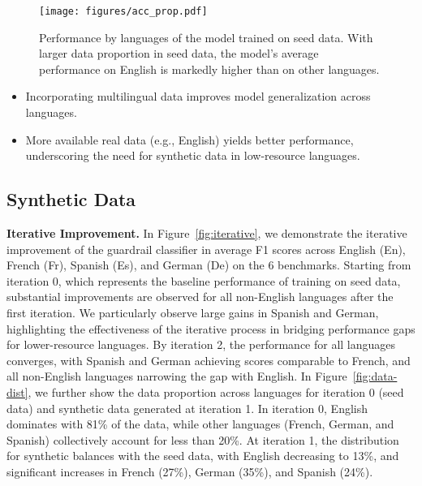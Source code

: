 \begin{figure}[!ht]
    \centering
    \texttt{[image: figures/acc\_prop.pdf]}
    \vspace{-3mm}
    \caption{Performance by languages of the model trained on seed data. With larger data proportion in seed data, the model's average performance on English is markedly higher than on other languages.}
    \label{fig:acc_prop}
\end{figure}

\begin{tcolorbox}[colback=gray!10, colframe=black!80, title=Takeaways., sharp corners, boxrule=0.3pt, fonttitle=\bfseries]
\begin{itemize}[leftmargin=*]
    \item Incorporating multilingual data improves model generalization across languages.
    \item More available real data (e.g., English) yields better performance, underscoring the need for synthetic data in low-resource languages.
\end{itemize}
\end{tcolorbox}

\subsection{Synthetic Data}
\textbf{Iterative Improvement.} 
In Figure~\ref{fig:iterative}, we demonstrate the iterative improvement of the guardrail classifier in average F1 scores across English (En), French (Fr), Spanish (Es), and German (De) on the 6 benchmarks. Starting from iteration 0, which represents the baseline performance of training on seed data, substantial improvements are observed for all non-English languages after the first iteration. We particularly observe large gains in Spanish and German, highlighting the effectiveness of the iterative process in bridging performance gaps for lower-resource languages. By iteration 2, the performance for all languages converges, with Spanish and German achieving scores comparable to French, and all non-English languages narrowing the gap with English. In Figure~\ref{fig:data-dist}, we further show the data proportion across languages for iteration 0 (seed data) and synthetic data generated at iteration 1. In iteration 0, English dominates with 81\% of the data, while other languages (French, German, and Spanish) collectively account for less than 20\%. At iteration 1, the distribution for synthetic balances with the seed data, with English decreasing to 13\%, and significant increases in French (27\%), German (35\%), and Spanish (24\%). 

